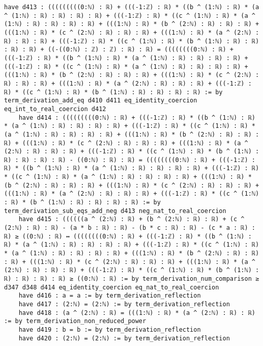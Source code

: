 \documentclass{article}
\begin{document}
\begin{tcolorbox}[colback=white!10, width=\linewidth]
\begin{lstlisting}[language=Lean4]
    have d413 : (((((((((0:ℕ) : ℝ) + (((-1:ℤ) : ℝ) * ((b ^ (1:ℕ) : ℝ) * (a ^ (1:ℕ) : ℝ) : ℝ) : ℝ) : ℝ) + (((-1:ℤ) : ℝ) * ((c ^ (1:ℕ) : ℝ) * (a ^ (1:ℕ) : ℝ) : ℝ) : ℝ) : ℝ) + (((1:ℕ) : ℝ) * (b ^ (2:ℕ) : ℝ) : ℝ) : ℝ) + (((1:ℕ) : ℝ) * (c ^ (2:ℕ) : ℝ) : ℝ) : ℝ) + (((1:ℕ) : ℝ) * (a ^ (2:ℕ) : ℝ) : ℝ) : ℝ) + (((-1:ℤ) : ℝ) * ((c ^ (1:ℕ) : ℝ) * (b ^ (1:ℕ) : ℝ) : ℝ) : ℝ) : ℝ) + ((-((0:ℕ) : ℤ) : ℤ) : ℝ) : ℝ) = ((((((((0:ℕ) : ℝ) + (((-1:ℤ) : ℝ) * ((b ^ (1:ℕ) : ℝ) * (a ^ (1:ℕ) : ℝ) : ℝ) : ℝ) : ℝ) + (((-1:ℤ) : ℝ) * ((c ^ (1:ℕ) : ℝ) * (a ^ (1:ℕ) : ℝ) : ℝ) : ℝ) : ℝ) + (((1:ℕ) : ℝ) * (b ^ (2:ℕ) : ℝ) : ℝ) : ℝ) + (((1:ℕ) : ℝ) * (c ^ (2:ℕ) : ℝ) : ℝ) : ℝ) + (((1:ℕ) : ℝ) * (a ^ (2:ℕ) : ℝ) : ℝ) : ℝ) + (((-1:ℤ) : ℝ) * ((c ^ (1:ℕ) : ℝ) * (b ^ (1:ℕ) : ℝ) : ℝ) : ℝ) : ℝ) := by term_derivation_add_eq d410 d411 eq_identity_coercion eq_int_to_real_coercion d412
    have d414 : (((((((((0:ℕ) : ℝ) + (((-1:ℤ) : ℝ) * ((b ^ (1:ℕ) : ℝ) * (a ^ (1:ℕ) : ℝ) : ℝ) : ℝ) : ℝ) + (((-1:ℤ) : ℝ) * ((c ^ (1:ℕ) : ℝ) * (a ^ (1:ℕ) : ℝ) : ℝ) : ℝ) : ℝ) + (((1:ℕ) : ℝ) * (b ^ (2:ℕ) : ℝ) : ℝ) : ℝ) + (((1:ℕ) : ℝ) * (c ^ (2:ℕ) : ℝ) : ℝ) : ℝ) + (((1:ℕ) : ℝ) * (a ^ (2:ℕ) : ℝ) : ℝ) : ℝ) + (((-1:ℤ) : ℝ) * ((c ^ (1:ℕ) : ℝ) * (b ^ (1:ℕ) : ℝ) : ℝ) : ℝ) : ℝ) - ((0:ℕ) : ℝ) : ℝ) = ((((((((0:ℕ) : ℝ) + (((-1:ℤ) : ℝ) * ((b ^ (1:ℕ) : ℝ) * (a ^ (1:ℕ) : ℝ) : ℝ) : ℝ) : ℝ) + (((-1:ℤ) : ℝ) * ((c ^ (1:ℕ) : ℝ) * (a ^ (1:ℕ) : ℝ) : ℝ) : ℝ) : ℝ) + (((1:ℕ) : ℝ) * (b ^ (2:ℕ) : ℝ) : ℝ) : ℝ) + (((1:ℕ) : ℝ) * (c ^ (2:ℕ) : ℝ) : ℝ) : ℝ) + (((1:ℕ) : ℝ) * (a ^ (2:ℕ) : ℝ) : ℝ) : ℝ) + (((-1:ℤ) : ℝ) * ((c ^ (1:ℕ) : ℝ) * (b ^ (1:ℕ) : ℝ) : ℝ) : ℝ) : ℝ) := by term_derivation_sub_eqs_add_neg d413 neg_nat_to_real_coercion
    have d415 : ((((((a ^ (2:ℕ) : ℝ) + (b ^ (2:ℕ) : ℝ) : ℝ) + (c ^ (2:ℕ) : ℝ) : ℝ) - (a * b : ℝ) : ℝ) - (b * c : ℝ) : ℝ) - (c * a : ℝ) : ℝ) ≥ ((0:ℕ) : ℝ) ↔ ((((((((0:ℕ) : ℝ) + (((-1:ℤ) : ℝ) * ((b ^ (1:ℕ) : ℝ) * (a ^ (1:ℕ) : ℝ) : ℝ) : ℝ) : ℝ) + (((-1:ℤ) : ℝ) * ((c ^ (1:ℕ) : ℝ) * (a ^ (1:ℕ) : ℝ) : ℝ) : ℝ) : ℝ) + (((1:ℕ) : ℝ) * (b ^ (2:ℕ) : ℝ) : ℝ) : ℝ) + (((1:ℕ) : ℝ) * (c ^ (2:ℕ) : ℝ) : ℝ) : ℝ) + (((1:ℕ) : ℝ) * (a ^ (2:ℕ) : ℝ) : ℝ) : ℝ) + (((-1:ℤ) : ℝ) * ((c ^ (1:ℕ) : ℝ) * (b ^ (1:ℕ) : ℝ) : ℝ) : ℝ) : ℝ) ≥ ((0:ℕ) : ℝ) := by term_derivation_num_comparison ≥ d347 d348 d414 eq_identity_coercion eq_nat_to_real_coercion
    have d416 : a = a := by term_derivation_reflection
    have d417 : (2:ℕ) = (2:ℕ) := by term_derivation_reflection
    have d418 : (a ^ (2:ℕ) : ℝ) = (((1:ℕ) : ℝ) * (a ^ (2:ℕ) : ℝ) : ℝ) := by term_derivation_non_reduced_power
    have d419 : b = b := by term_derivation_reflection
    have d420 : (2:ℕ) = (2:ℕ) := by term_derivation_reflection

\end{lstlisting}
\end{tcolorbox}
\end{document}
